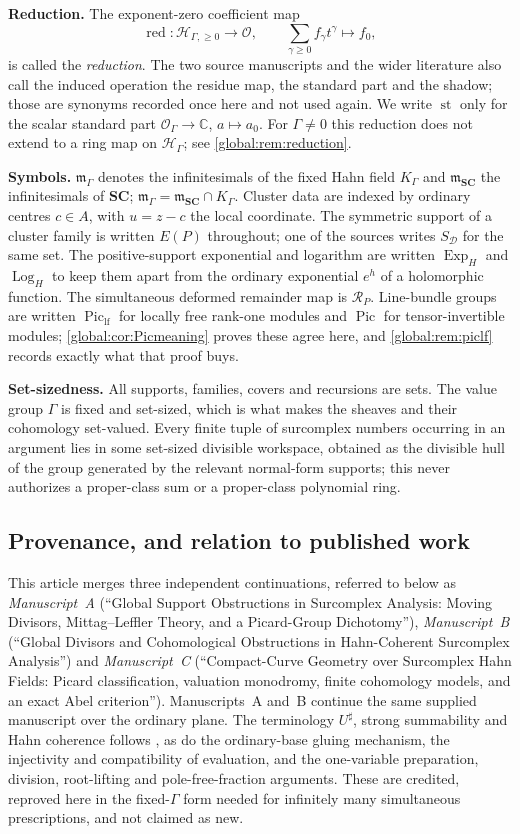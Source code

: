 \documentclass[11pt,letterpaper]{article}
\theoremstyle{definition}
\theoremstyle{remark}
\newcommand{\SC}{\mathbf{SC}}
\newcommand{\C}{\mathbb C}
\newcommand{\OO}{\mathcal O}
\newcommand{\HH}{\mathscr H_\Gamma}
\newcommand{\HI}{\mathscr H_{\Gamma,\ge0}}
\newcommand{\KK}{K_\Gamma}
\newcommand{\mK}{\mathfrak m_\Gamma}
\newcommand{\mSC}{\mathfrak m_{\SC}}
\newcommand{\sh}{^{\sharp}}
\newcommand{\st}{\operatorname{st}}
\newcommand{\red}{\operatorname{red}}
\newcommand{\Pic}{\operatorname{Pic}}
\newcommand{\Piclf}{\operatorname{Pic}_{\mathrm{lf}}}
\newcommand{\ExpH}{\operatorname{Exp}_{H}}
\newcommand{\LogH}{\operatorname{Log}_{H}}
\newcommand{\jet}{\mathcal R}
\numberwithin{equation}{section}
\begin{document}
\smallskip
\noindent\textbf{Reduction.} The exponent-zero coefficient map
\[
  \red:\HI\longrightarrow\OO,
  \qquad \sum_{\gamma\ge0}f_\gamma t^\gamma\longmapsto f_0,
\]
is called the \emph{reduction}. The two source manuscripts and the wider literature also call the induced operation the residue map, the standard part and the shadow; those are synonyms recorded once here and not used again. We write $\st$ only for the scalar standard part $\OO_\Gamma\to\C$, $a\mapsto a_0$. For $\Gamma\ne0$ this reduction does not extend to a ring map on $\HH$; see \cref{global:rem:reduction}.

\smallskip
\noindent\textbf{Symbols.} $\mK$ denotes the infinitesimals of the fixed Hahn field $\KK$ and $\mSC$ the infinitesimals of $\SC$; $\mK=\mSC\cap\KK$. Cluster data are indexed by ordinary centres $c\in A$, with $u=z-c$ the local coordinate. The symmetric support of a cluster family is written $E(P)$ throughout; one of the sources writes $S_{\mathcal D}$ for the same set. The positive-support exponential and logarithm are written $\ExpH$ and $\LogH$ to keep them apart from the ordinary exponential $e^h$ of a holomorphic function. The simultaneous deformed remainder map is $\jet_P$. Line-bundle groups are written $\Piclf$ for locally free rank-one modules and $\Pic$ for tensor-invertible modules; \cref{global:cor:Picmeaning} proves these agree here, and \cref{global:rem:piclf} records exactly what that proof buys.

\smallskip
\noindent\textbf{Set-sizedness.} All supports, families, covers and recursions are sets. The value group $\Gamma$ is fixed and set-sized, which is what makes the sheaves and their cohomology set-valued. Every finite tuple of surcomplex numbers occurring in an argument lies in some set-sized divisible workspace, obtained as the divisible hull of the group generated by the relevant normal-form supports; this never authorizes a proper-class sum or a proper-class polynomial ring.

\subsection{Provenance, and relation to published work}\label{global:sub:provenance}

This article merges three independent continuations, referred to below as \emph{Manuscript~A} (``Global Support Obstructions in Surcomplex Analysis: Moving Divisors, Mittag--Leffler Theory, and a Picard-Group Dichotomy''), \emph{Manuscript~B} (``Global Divisors and Cohomological Obstructions in Hahn-Coherent Surcomplex Analysis'') and \emph{Manuscript~C} (``Compact-Curve Geometry over Surcomplex Hahn Fields: Picard classification, valuation monodromy, finite cohomology models, and an exact Abel criterion''). Manuscripts~A and~B continue the same supplied manuscript \cite{Source} over the ordinary plane. The terminology $U\sh$, strong summability and Hahn coherence follows \cite{Source}, as do the ordinary-base gluing mechanism, the injectivity and compatibility of evaluation, and the one-variable preparation, division, root-lifting and pole-free-fraction arguments. These are credited, reproved here in the fixed-$\Gamma$ form needed for infinitely many simultaneous prescriptions, and not claimed as new.
\end{document}
